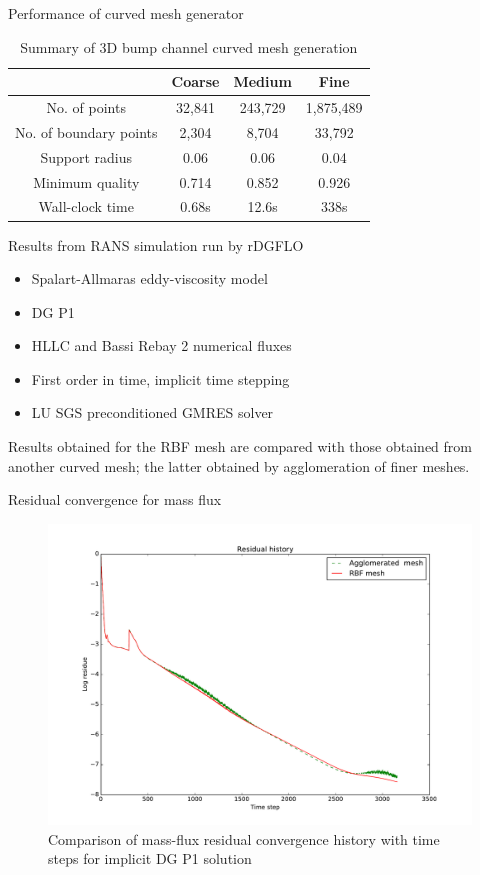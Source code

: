 \documentclass[t,12pt]{beamer}
\begin{document}
\begin{frame}{Performance of curved mesh generator}
	\begin{table}
		\centering
		\begin{tabular}{|c|c|c|c|}
			\hline
			& Coarse & Medium & Fine \\
			\hline
			No. of points 				& 32,841 & 243,729	& 1,875,489 \\
			No. of boundary points		& 2,304	& 8,704		& 33,792 \\
			Support radius				& 0.06	& 0.06		& 0.04 \\
			Minimum quality			& 0.714	& 0.852		& 0.926 \\
			Wall-clock time			& 0.68s	& 12.6s		& 338s \\
			\hline
		\end{tabular}
		\caption{Summary of 3D bump channel curved mesh generation}
	\end{table}
\end{frame}

\begin{frame}
Results from RANS simulation run by rDGFLO 
\begin{itemize}
	\item Spalart-Allmaras eddy-viscosity model
	\item DG P1
	\item HLLC and Bassi Rebay 2 numerical fluxes
	\item First order in time, implicit time stepping
	\item LU SGS preconditioned GMRES solver
\end{itemize}
Results obtained for the RBF mesh are compared with those obtained from another curved mesh; the latter obtained by agglomeration of finer meshes.
\end{frame}

\begin{frame}{Residual convergence for mass flux}
\begin{figure}
	\centering
	\includegraphics[scale=0.27]{solver-convergence}
	\caption{Comparison of mass-flux residual convergence history with time steps for implicit DG P1 solution}
	\label{fig:resconvergence}
\end{figure}
\end{frame}
\end{document}
